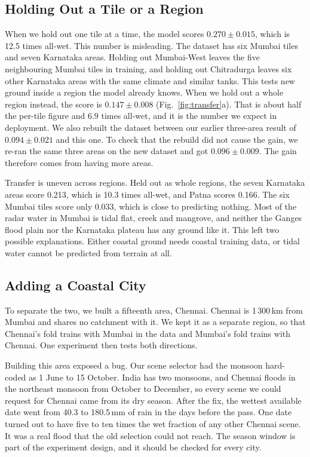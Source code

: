 \documentclass[conference]{IEEEtran}
\begin{document}
\subsection{Holding Out a Tile or a Region}
When we hold out one tile at a time, the model scores $0.270 \pm 0.015$, which is 12.5 times
all-wet. This number is misleading. The dataset has six Mumbai tiles and seven Karnataka areas.
Holding out Mumbai-West leaves the five neighbouring Mumbai tiles in training, and holding out
Chitradurga leaves six other Karnataka areas with the same climate and similar tanks. This tests new
ground inside a region the model already knows. When we hold out a whole region instead, the score
is $0.147 \pm 0.008$ (Fig.~\ref{fig:transfer}a). That is about half the per-tile figure and 6.9
times all-wet, and it is the number we expect in deployment. We also rebuilt the dataset between our
earlier three-area result of $0.094 \pm 0.021$ and this one. To check that the rebuild did not
cause the gain, we re-ran the same three areas on the new dataset and got $0.096 \pm 0.009$. The
gain therefore comes from having more areas.

Transfer is uneven across regions. Held out as whole regions, the seven Karnataka areas score 0.213,
which is 10.3 times all-wet, and Patna scores 0.166. The six Mumbai tiles score only 0.033, which is
close to predicting nothing. Most of the radar water in Mumbai is tidal flat, creek and mangrove, and
neither the Ganges flood plain nor the Karnataka plateau has any ground like it. This left two
possible explanations. Either coastal ground needs coastal training data, or tidal water cannot be
predicted from terrain at all.

\subsection{Adding a Coastal City}
To separate the two, we built a fifteenth area, Chennai. Chennai is 1\,300\,km from Mumbai and
shares no catchment with it. We kept it as a separate region, so that Chennai's fold trains with
Mumbai in the data and Mumbai's fold trains with Chennai. One experiment then tests both directions.

Building this area exposed a bug. Our scene selector had the monsoon hard-coded as 1 June to 15
October. India has two monsoons, and Chennai floods in the northeast monsoon from October to
December, so every scene we could request for Chennai came from its dry season. After the fix, the
wettest available date went from 40.3 to 180.5\,mm of rain in the days before the pass. One date
turned out to have five to ten times the wet fraction of any other Chennai scene. It was a real
flood that the old selection could not reach. The season window is part of the experiment design,
and it should be checked for every city.
\end{document}

